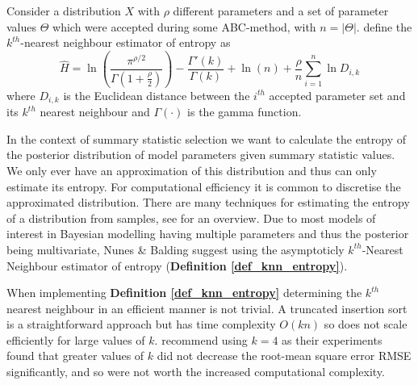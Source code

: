 \documentclass[11pt,a4paper]{article}
\theoremstyle{break}
\begin{document}

  \begin{box_definition}\label{def_knn_entropy}
    Consider a distribution $X$ with $\rho$ different parameters and a set of parameter values $\Theta$ which were accepted during some ABC-method, with $n=|\Theta|$. \cite{nearest_neighbour_estimates_of_entropy} define the $k^{th}$-nearest neighbour estimator of entropy as
    \[ \hat{H}=\ln\left(\frac{\pi^{\rho/2}}{\Gamma\left(1+\frac\rho2\right)}\right)-\frac{\Gamma'(k)}{\Gamma(k)}+\ln(n)+\frac\rho{n}\sum_{i=1}^n\ln D_{i,k} \]
    where $D_{i,k}$ is the Euclidean distance between the $i^{th}$ accepted parameter set and its $k^{th}$ nearest neighbour and $\Gamma(\cdot)$ is the gamma function.
  \end{box_definition}

  \par In the context of summary statistic selection we want to calculate the entropy of the posterior distribution of model parameters given summary statistic values. We only ever have an approximation of this distribution and thus can only estimate its entropy. For computational efficiency it is common to discretise the approximated distribution. There are many techniques for estimating the entropy of a distribution from samples, see \cite[]{non_parameteric_entropy_estimation} for an overview. Due to most models of interest in Bayesian modelling having multiple parameters and thus the posterior being multivariate, Nunes \& Balding suggest using the asymptoticly $k^{th}$-Nearest Neighbour estimator of entropy \cite{nearest_neighbour_estimates_of_entropy} (\textbf{Definition \ref{def_knn_entropy}}).

  \par When implementing \textbf{Definition \ref{def_knn_entropy}} determining the $k^{th}$ nearest neighbour in an efficient manner is not trivial. A truncated insertion sort is a straightforward approach but has time complexity $O(kn)$ so does not scale efficiently for large values of $k$. \cite[]{nearest_neighbour_estimates_of_entropy} recommend using $k=4$ as their experiments found that greater values of $k$ did not decrease the root-mean square error RMSE significantly, and so were not worth the increased computational complexity.
\end{document}
